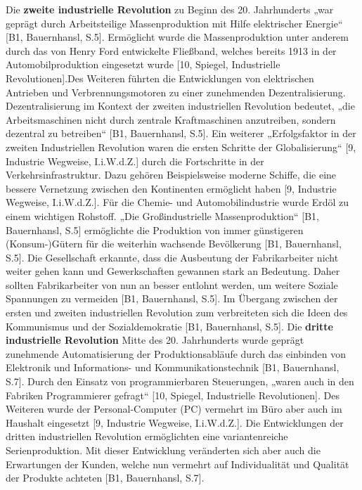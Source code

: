 \newline\newline
Die \textbf{zweite industrielle Revolution} zu Beginn des 20. Jahrhunderts „war geprägt durch Arbeitsteilige Massenproduktion mit Hilfe elektrischer Energie“ [B1, Bauernhansl, S.5]. Ermöglicht wurde die Massenproduktion unter anderem durch das von Henry Ford entwickelte Fließband, welches bereits 1913 in der Automobilproduktion eingesetzt wurde [10, Spiegel, Industrielle Revolutionen].Des Weiteren führten die Entwicklungen von elektrischen Antrieben und Verbrennungsmotoren zu einer zunehmenden Dezentralisierung. Dezentralisierung im Kontext der zweiten industriellen Revolution bedeutet, „die Arbeitsmaschinen nicht durch zentrale Kraftmaschinen anzutreiben, sondern dezentral zu betreiben“ [B1, Bauernhansl, S.5]. Ein weiterer „Erfolgsfaktor in der zweiten Industriellen Revolution waren die ersten Schritte der Globalisierung“ [9, Industrie Wegweise, I.i.W.d.Z.] durch die Fortschritte in der Verkehrsinfrastruktur. Dazu gehören Beispielsweise moderne Schiffe, die eine bessere Vernetzung zwischen den Kontinenten ermöglicht haben [9, Industrie Wegweise, I.i.W.d.Z.]. Für die Chemie- und Automobilindustrie wurde Erdöl zu einem wichtigen Rohstoff. „Die Großindustrielle Massenproduktion“ [B1, Bauernhansl, S.5] ermöglichte die Produktion von immer günstigeren (Konsum-)Gütern für die weiterhin wachsende Bevölkerung [B1, Bauernhansl, S.5]. Die Gesellschaft erkannte, dass die Ausbeutung der Fabrikarbeiter nicht weiter gehen kann und Gewerkschaften gewannen stark an Bedeutung. Daher sollten Fabrikarbeiter von nun an besser entlohnt werden, um weitere Soziale Spannungen zu vermeiden [B1, Bauernhansl, S.5]. Im Übergang zwischen der ersten und zweiten industriellen Revolution zum verbreiteten sich die Ideen des Kommunismus und der Sozialdemokratie [B1, Bauernhansl, S.5].
\newline\newline
Die \textbf{dritte industrielle Revolution} Mitte des 20. Jahrhunderts wurde geprägt zunehmende Automatisierung der Produktionsabläufe durch das einbinden von Elektronik und Informations- und Kommunikationstechnik [B1, Bauernhansl, S.7]. Durch den Einsatz von programmierbaren Steuerungen, „waren auch in den Fabriken Programmierer gefragt“ [10, Spiegel, Industrielle Revolutionen]. Des Weiteren wurde der Personal-Computer (PC) vermehrt im Büro aber auch im Haushalt eingesetzt [9, Industrie Wegweise, I.i.W.d.Z.]. Die Entwicklungen der dritten industriellen Revolution ermöglichten eine variantenreiche Serienproduktion. Mit dieser Entwicklung veränderten sich aber auch die Erwartungen der Kunden, welche nun vermehrt auf Individualität und Qualität der Produkte achteten [B1, Bauernhansl, S.7].
